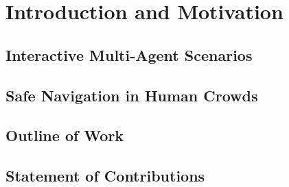 \chapter{Introduction and Motivation}
\label{text:introduction}


\section{Interactive Multi-Agent Scenarios}
\label{text:introduction/interactive_multi_agent_scenarios}

\section{Safe Navigation in Human Crowds}
\label{text:introduction/safe_navigation_human_crowds}


\section{Outline of Work}
\label{text:introduction/outline}

\section{Statement of Contributions}
\label{text:introduction/contributions}


